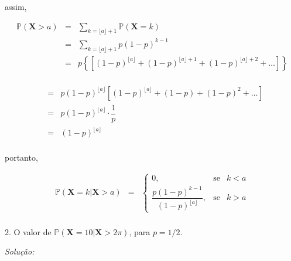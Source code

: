 \documentclass[a4paper, 11pt]{article}
\begin{document}
\noindent
assim,

\begin{equation*}
\begin{array}{rclll}
\mathds{P}(\mathbf{X} > a) & = & \displaystyle\sum_{k=\lfloor a \rfloor + 1}\mathds{P}(\mathbf{X} = k)  \\[15pt]

& = & \displaystyle\sum_{k=\lfloor a \rfloor + 1}p(1-p)^{k-1}  \\[15pt]

& = & p \left\{ \left[(1-p)^{\lfloor a \rfloor} + (1-p)^{\lfloor a \rfloor + 1} + (1-p)^{\lfloor a \rfloor + 2} + \ldots \right] \right\}  \\[15pt]

\end{array}
\end{equation*}

\begin{equation*}
\begin{array}{rclll}

& = & p (1-p)^{\lfloor a \rfloor} \left[(1-p)^{\lfloor a \rfloor} + (1-p) + (1-p)^{2} + \ldots \right] \\[15pt]

& = & p (1-p)^{\lfloor a \rfloor} \cdot \dfrac{1}{p} \\[15pt]

& = & (1-p)^{\lfloor a \rfloor} \\[15pt]
\end{array}
\end{equation*}

\noindent
portanto,

\begin{equation*}
\begin{array}{rclll}
\mathds{P}(\mathbf{X} = k|\mathbf{X}>a) & = & \left\{
    \begin{array}{rrlc}
         0, & \mbox{se} & k < a \\[10pt]
         \dfrac{p(1-p)^{k-1}}{(1-p)^{\lfloor a \rfloor}}, & \mbox{se} & k>a
    \end{array}
\right.\\[25pt]

\end{array}
\end{equation*}

2. O valor de $\mathds{P}(\mathbf{X} = 10|\mathbf{X}>2\pi)$, para $p=1/2$.

\noindent
\textit{Solução:} \\
\end{document}
